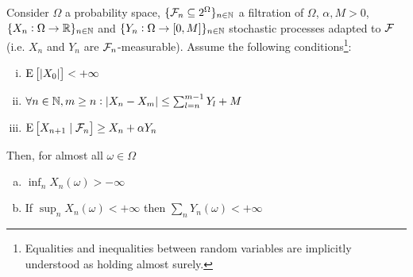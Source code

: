 \begin{samepage}
\begin{lemma}
\label{lmm:prudent}

Consider $\Omega$ a probability space, $\{\mathcal{F}_n \subseteq 2^\Omega\}_{n \in \mathbb{N}}$ a filtration of $\Omega$, $\alpha,M > 0$, $\{X_n: \Omega \rightarrow \mathbb{R}\}_{n \in \mathbb{N}}$ and $\{Y_n: \Omega \rightarrow \left[0,M\right]\}_{n \in \mathbb{N}}$ stochastic processes adapted to $\mathcal{F}$ (i.e. $X_n$ and $Y_n$ are $\mathcal{F}_n$-measurable). Assume the following conditions\footnote{Equalities and inequalities between random variables are implicitly understood as holding almost surely.}:

\begin{enumerate}[i.]

\item $\operatorname{E}\left[\lvert X_0 \rvert\right] < +\infty$
\item $\forall n \in \mathbb{N}, m \geq n: \lvert X_n - X_m \rvert \leq \sum_{l=n}^{m-1} Y_l + M$
\item $\operatorname{E}\left[X_{n+1} \mid \mathcal{F}_n\right] \geq X_n + \alpha Y_n$

\end{enumerate}

Then, for almost all $\omega \in \Omega$

\begin{enumerate}[a.]

\item\label{itm:lmm_prudent__inf} $\inf_n X_n\left(\omega\right) > -\infty$
\item\label{itm:lmm_prudent__sup} If $\sup_n X_n\left(\omega\right) < +\infty$ then $\sum_n Y_n\left(\omega\right) < +\infty$

\end{enumerate}

\end{lemma}
\end{samepage}

